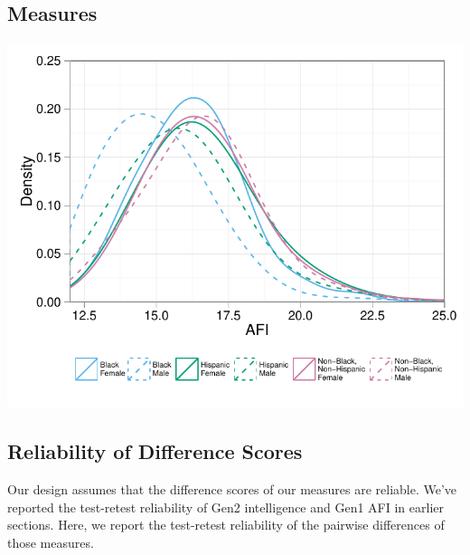 \documentclass[a4paper,man,apacite,natbib,12pt,longtable,mask]{apa6}\usepackage[]{graphicx}\usepackage[]{color}
\newenvironment{knitrout}{}{} %
\begin{document}
\subsection{Measures}

\noindent\begin{minipage}{\linewidth}
\label{plot_afi_by_race_sex}
\begin{center}
\begin{knitrout}
\color{fgcolor}
\includegraphics[width=.65\paperwidth]{figure/plot_afi_by_race_sex-1} 

\end{knitrout}
\end{center}
\end{minipage}
%

%
\subsection{Reliability of Difference Scores}

Our design assumes that the difference scores of our measures are reliable. We've reported the test-retest reliability of Gen2 intelligence and Gen1 AFI in earlier sections. Here, we report the test-retest reliability of the pairwise differences of those measures. 
\end{document}
